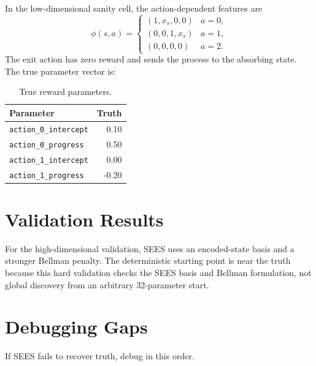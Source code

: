 \documentclass[10pt]{article}
\begin{document}
In the low-dimensional sanity cell, the action-dependent features are
\[
\phi(s,a)
=
\begin{cases}
(1, x_s, 0, 0) & a = 0,\\
(0, 0, 1, x_s) & a = 1,\\
(0, 0, 0, 0) & a = 2.
\end{cases}
\]
The exit action has zero reward and sends the process to the absorbing state.
The true parameter vector is:

\begin{table}[H]
\centering\small
\caption{True reward parameters.}
\begin{tabular}{lr}
\toprule
Parameter & Truth \\
\midrule
\texttt{action\_0\_intercept} & 0.10 \\
\texttt{action\_0\_progress} & 0.50 \\
\texttt{action\_1\_intercept} & 0.00 \\
\texttt{action\_1\_progress} & -0.20 \\
\bottomrule
\end{tabular}
\end{table}

\section{Validation Results}

For the high-dimensional validation, SEES uses an encoded-state basis and a
stronger Bellman penalty. The deterministic starting point is near the truth
because this hard validation checks the SEES basis and Bellman formulation,
not global discovery from an arbitrary 32-parameter start.



\section{Debugging Gaps}

If SEES fails to recover truth, debug in this order.
\end{document}
